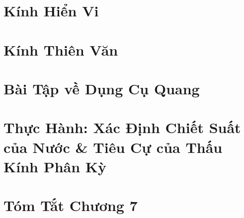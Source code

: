 \documentclass[oneside]{book}
\numberwithin{equation}{section}
\begin{document}

\section{Kính Hiển Vi}


\section{Kính Thiên Văn}


\section{Bài Tập về Dụng Cụ Quang}


\section{Thực Hành: Xác Định Chiết Suất của Nước \& Tiêu Cự của Thấu Kính Phân Kỳ}


\section{Tóm Tắt Chương 7}


\printbibliography[heading=bibintoc]
	
\end{document}
